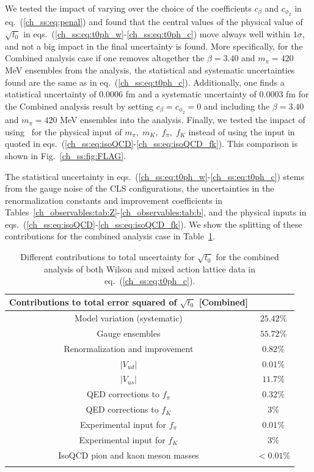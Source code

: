 We tested the impact of varying over the choice of the coefficients $c_{\beta}$ and $c_{\phi_2}$ in eq.~(\ref{ch_ss:eq:penal}) and found that the central values of the physical value of $\sqrt{t_0}$ in eqs.~(\ref{ch_ss:eq:t0ph_w}-\ref{ch_ss:eq:t0ph_c}) move always well within $1\sigma$, and not a big impact in the final uncertainty is found. More specifically, for the Combined analysis case if one removes altogether the $\beta=3.40$ and $m_{\pi}=420$ MeV ensembles from the analysis, the statistical and systematic uncertainties found are the same as in eq.~(\ref{ch_ss:eq:t0ph_c}). Additionally, one finds a statistical uncertainty of $0.0006$ fm and a systematic uncertainty of $0.0003$ fm for the Combined analysis result by setting $c_{\beta}=c_{\phi_2}=0$ and including the $\beta=3.40$ and $m_{\pi}=420$ MeV ensembles into the analysis. Finally, we tested the impact of using~\citep{FLAG16} for the physical input of $m_{\pi},\;m_K,\;f_{\pi},\;f_K$ instead of using the input in~\citep{FlavourLatticeAveragingGroupFLAG:2021npn} quoted in eqs.~(\ref{ch_ss:eq:isoQCD}-\ref{ch_ss:eq:isoQCD_fk}). This comparison is shown in Fig.~\ref{ch_ss:fig:FLAG}.

The statistical uncertainty in eqs.~(\ref{ch_ss:eq:t0ph_w}-\ref{ch_ss:eq:t0ph_c}) stems from the gauge noise of the CLS configurations, the uncertainties in the renormalization constants and improvement coefficients in Tables~\ref{ch_observables:tab:Z}-\ref{ch_observables:tab:b}, and the physical inputs in eqs.~(\ref{ch_ss:eq:isoQCD}-\ref{ch_ss:eq:isoQCD_fk}). We show the splitting of these contributions for the combined analysis case in Table~\ref{ch_ss:tab:stat}.

\begin{longtable}{c c}
\label{ch_ss:tab:stat}
	Contributions to total error squared of $\sqrt{t_0}$ [Combined] & \\
	\toprule
	Model variation (systematic) & $25.42\%$ \\
	Gauge ensembles & $55.72\%$ \\
	Renormalization and improvement & $0.82\%$ \\
	$\left|V_{ud}\right|$ & $0.01\%$ \\
	$\left|V_{us}\right|$ & $11.7\%$ \\
	QED corrections to $f_{\pi}$ & $0.32\%$ \\
	QED corrections to $f_K$ & $3\%$ \\
	Experimental input for $f_{\pi}$ & $0.01\%$ \\
	Experimental input for $f_K$ & $3\%$ \\
	IsoQCD pion and kaon meson masses & $<0.01\%$ \\
    \bottomrule
    \caption{Different contributions to total uncertainty for $\sqrt{t_0}$ for the combined analysis of both Wilson and mixed action lattice data in eq.~(\ref{ch_ss:eq:t0ph_c}).}
\end{longtable}

